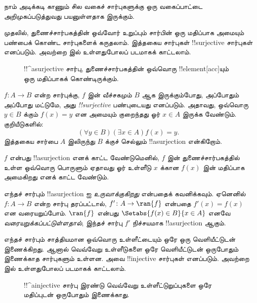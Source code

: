 \documentclass[../../../include/open-logic-section]{subfiles}
\begin{document}

\begin{explain}
நாம் அடிக்கடி காணும் சில வகைச் சார்புகளுக்கு ஒரு வகைப்பாட்டை
அறிமுகப்படுத்துவது பயனுள்ளதாக இருக்கும்.

முதலில், துணைச்சார்பகத்தின் ஒவ்வோர் உறுப்பும் சார்பின் ஒரு மதிப்பாக
அமையும் பண்பைக் கொண்ட சார்புகளைக் கருதலாம். இத்தகைய சார்புகள்
!!{surjective} சார்புகள் எனப்படும். அவற்றை 
இல் உள்ளதுபோலப் படமாகக் காட்டலாம்.

\begin{figure}
  \caption{!!^a{surjective} சார்பு, துணைச்சார்பகத்தின் ஒவ்வொரு
    !!{element}[acc]யும் ஒரு மதிப்பாகக் கொண்டிருக்கும்.}
\end{figure}
\end{explain}

\begin{defn}[!!^{surjective} சார்பு]
$f \colon A \rightarrow B$ என்ற சார்புக்கு, $f$ இன் வீச்சகமும் $B$ ஆக
இருக்கும்போது, அப்போதும் அப்போது மட்டுமே, அது
\emph{!!{surjective}} பண்புடையது எனப்படும்.
அதாவது, ஒவ்வொரு $y \in B$ க்கும் $f(x) = y$ என அமையும் குறைந்தது
ஓர் $x \in A$ இருக்க வேண்டும். குறியீடுகளில்:
\[
  (\forall y \in B)(\exists x \in A)f(x) = y.
\]
இத்தகைய சார்பை $A$ இலிருந்து $B$ க்குச் செல்லும்
!!a{surjection} என்கிறோம்.
\end{defn}

\begin{explain}
$f$ என்பது !!a{surjection} எனக் காட்ட வேண்டுமெனில், $f$ இன்
துணைச்சார்பகத்தில் உள்ள ஒவ்வொரு பொருளும் ஏதாவது ஓர் உள்ளீடு $x$ க்கான
$f(x)$ இன் மதிப்பாக அமைகிறது எனக் காட்ட வேண்டும்.

எந்தச் சார்பும் !!a{surjection} ஐ \emph{உருவாக்குகிறது} என்பதைக்
கவனிக்கவும். ஏனெனில் $f \colon A \to B$ என்ற சார்பு தரப்பட்டால்,
$f' \colon A \to \ran{f}$ என்பதை $f'(x) = f(x)$ என வரையறுப்போம்.
$\ran{f}$ என்பது $\Setabs{f(x) \in B}{x \in A}$ எனவே
\emph{வரையறுக்கப்பட்டுள்ளதால்}, இந்தச் சார்பு $f'$ நிச்சயமாக
!!a{surjection} ஆகும்.
\end{explain}

\begin{explain}
எந்தச் சார்பும் சாத்தியமான ஒவ்வொரு உள்ளீட்டையும் ஒரே ஒரு வெளியீட்டுடன்
இணைக்கிறது. ஆனால் வெவ்வேறு உள்ளீடுகளை ஒரே வெளியீட்டுடன் ஒருபோதும்
இணைக்காத சார்புகளும் உள்ளன. அவை !!{injective} சார்புகள் எனப்படும்.
அவற்றை  இல் உள்ளதுபோலப் படமாகக் காட்டலாம்.
\begin{figure}
  \caption{!!^a{injective} சார்பு இரண்டு வெவ்வேறு உள்ளீட்டுறுப்புகளை
    ஒரே மதிப்புடன் ஒருபோதும் இணைக்காது.}
\end{figure}
\end{explain}
\end{document}
